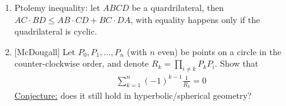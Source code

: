 \documentclass{treatise}
\begin{document}
\begin{shaded}
\begin{theorem}
\begin{enumerate}
\begin{center}
	\end{center}
	\item Ptolemy inequality: let $ABCD$ be a quardrilateral, then $AC \cdot BD \leq AB \cdot CD + BC \cdot DA$, with equality happens only if the quadrilateral is cyclic.
	\item {[McDougall]} Let $P_0, P_1, \hdots, P_n$ (with $n$ even) be points on a circle in the counter-clockwise order, and denote $R_k = \prod_{i \neq k} P_k P_i$. Show that
	\begin{align*}
	\sum_{k = 1}^n (-1)^{k - 1} \frac{1}{R_k} = 0
	\end{align*}
	\underline{Conjecture:} does it still hold in hyperbolic/spherical geometry?
\end{enumerate}
\end{theorem}
\end{shaded}

\newpage
\end{document}
